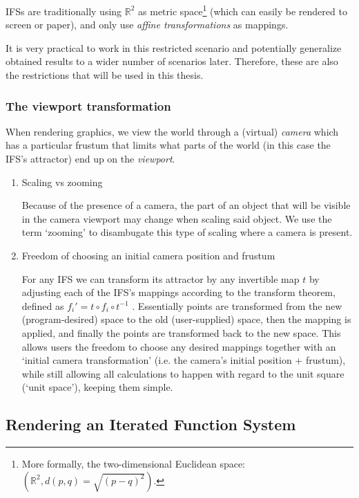 \documentclass[11pt]{article}
\begin{document}
IFSs are traditionally using \(\mathbb{R}^2\) as metric space\footnote{More formally, the two-dimensional Euclidean space: \(\left(\mathbb{R}^2, d(p, q) = \sqrt{(p - q)^2}\right)\).} (which can easily be rendered to screen or paper),
and only use \emph{affine transformations} as mappings.

It is very practical to work in this restricted scenario 
and potentially generalize obtained results to a wider number of scenarios later.
Therefore, these are also the restrictions that will be used in this thesis.

\subsubsection{The viewport transformation}
\label{sec:orgc228070}
\label{subsection:viewport_transformation}

When rendering graphics, we view the world through a (virtual) \emph{camera} which has a particular frustum 
that limits what parts of the world (in this case the IFS's attractor) end up on the \emph{viewport}.

\begin{enumerate}
\item Scaling vs zooming
\label{sec:org89ea1ba}

Because of the presence of a camera, the part of an object that will be visible in the camera viewport may change when scaling said object.
We use the term `zooming' to disambugate this type of scaling where a camera is present.

\item Freedom of choosing an initial camera position and frustum
\label{sec:org24aebeb}

For any IFS we can transform its attractor by any invertible map \(t\) by adjusting each of the IFS's mappings according to the
transform theorem, defined as \(f_i' = t \circ f_i \circ t^{-1}\) \cite{barnsley1988fractals}. 
Essentially points are transformed from the new (program-desired) space to the old (user-supplied) space, then the mapping is applied, and finally the points are transformed back to the new space.
This allows users the freedom to choose any desired mappings together with an `initial camera transformation' (i.e. the camera's initial position + frustum),
while still allowing all calculations to happen with regard to the unit square (`unit space'), keeping them simple.
\end{enumerate}

\subsection{Rendering an Iterated Function System}
\label{sec:orgf5cc6a6}
\end{document}
